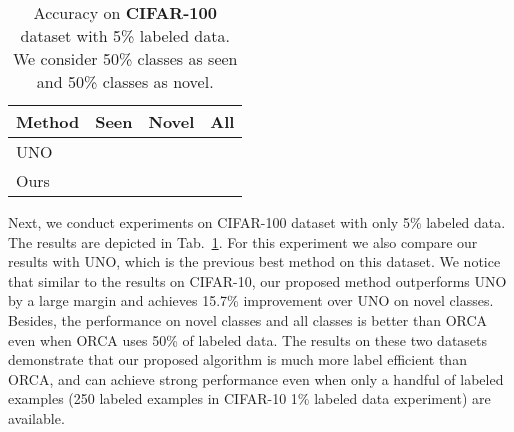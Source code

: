 \documentclass[runningheads]{eccv2022submission}
\begin{document}
\begin{table}[h]
\vspace{-2mm}
\caption{Accuracy on \textbf{CIFAR-100}  dataset with  5\% labeled data. We consider 50\% classes as seen and 50\% classes as novel.}
\label{tab:cifar100}
\begin{center}\setlength{\tabcolsep}{4pt}
\small
\begin{tabular}{lccc}
\hline

\textbf{Method}  & \textbf{Seen} & \textbf{Novel} & \textbf{All}\\




\hline
UNO\cite{fini2021unified} &  &  & \\
Ours & {\cellcolor{yellow!15}} & {\cellcolor{yellow!15}} & {\cellcolor{yellow!15}}\\\hline 



\end{tabular}
\end{center}


\vspace{-3mm}
\end{table}



Next, we conduct experiments on CIFAR-100 dataset with only 5\% labeled data. The results are depicted in Tab.~\ref{tab:cifar100}. For this experiment we also compare our results with UNO\cite{fini2021unified}, which is the previous best method on this dataset. We notice that similar to the results on CIFAR-10, our proposed method outperforms UNO by a large margin and achieves 15.7\% improvement over UNO on novel classes. Besides, the performance on novel classes and all classes is better than ORCA even when ORCA uses 50\% of labeled data. The results on these two datasets demonstrate that our proposed algorithm is much more label efficient than ORCA, and can achieve strong performance even when only a handful of labeled examples (250 labeled examples in CIFAR-10 1\% labeled data experiment) are available.  
\end{document}
